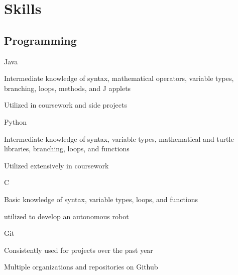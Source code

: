 \documentclass[]{resume-openfont}
\begin{document}
\begin{minipage}[t]{0.33\textwidth}

\section{Skills}
\subsection{Programming}
Java 
\begin{tightemize}
\vspace{\topsep}
\item Intermediate knowledge of syntax, mathematical operators, variable types, branching, loops, methods, and J applets \item Utilized in coursework and side projects\end{tightemize}
\vspace{\topsep}
Python
\begin{tightemize}
\vspace{\topsep}
\item Intermediate knowledge of syntax, variable types, mathematical and
turtle libraries, branching, loops, and functions \item Utilized extensively in coursework\end{tightemize}
\vspace{\topsep}
C
\begin{tightemize}
\vspace{\topsep}
\item Basic knowledge of syntax, variable types, loops, and functions \item utilized to develop an autonomous robot\end{tightemize}
\vspace{\topsep}
Git
\begin{tightemize}
\vspace{\topsep}
\item Consistently used for projects over the past year \item Multiple organizations and repositories on Github\end{tightemize}


%
%

\end{minipage} 
\hfill
\end{document}
